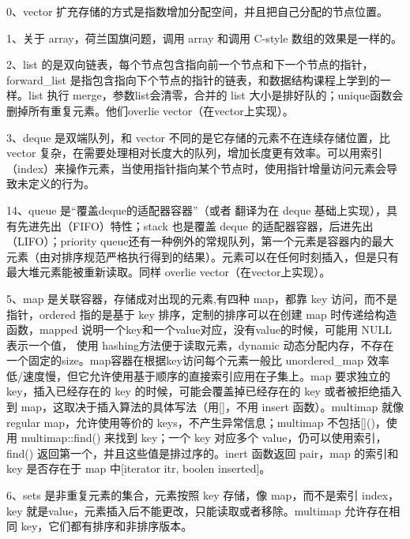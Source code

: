 

0、vector 扩充存储的方式是指数增加分配空间，并且把自己分配的节点位置。

1、关于 array，荷兰国旗问题，调用 array 和调用 C-\/style 数组的效果是一样的。

2、list 的是双向链表，每个节点包含指向前一个节点和下一个节点的指针，forward\+\_\+list 是指包含指向下个节点的指针的链表，和数据结构课程上学到的一样。list 执行 merge，参数list会清零，合并的 list 大小是排好队的；unique函数会删掉所有重复元素。他们overlie vector（在vector上实现）。

3、deque 是双端队列，和 vector 不同的是它存储的元素不在连续存储位置，比 vector 复杂，在需要处理相对长度大的队列，增加长度更有效率。可以用索引（index）来操作元素，当使用指针指向某个节点时，使用指针增量访问元素会导致未定义的行为。


\begin{DoxyCode}{0}
\DoxyCodeLine{}
\end{DoxyCode}


14、queue 是“覆盖deque的适配器容器”（或者 翻译为在 deque 基础上实现），具有先进先出（\+F\+I\+F\+O）特性；stack 也是覆盖 deque 的适配器容器，后进先出（\+L\+I\+F\+O）；priority queue还有一种例外的常规队列，第一个元素是容器内的最大元素（由对排序规范严格执行得到的结果）。元素可以在任何时刻插入，但是只有最大堆元素能被重新读取。同样 overlie vector（在vector上实现）。



5、map 是关联容器，存储成对出现的元素,有四种 map，都靠 key 访问，而不是指针，ordered 指的是基于 key 排序，定制的排序可以在创建 map 时传递给构造函数，mapped 说明一个key和一个value对应，没有value的时候，可能用 N\+U\+LL 表示一个值， 使用 hashing方法便于读取元素，dynamic 动态分配内存，不存在一个固定的size。map容器在根据key访问每个元素一般比 unordered\+\_\+map 效率低/速度慢，但它允许使用基于顺序的直接索引应用在子集上。map 要求独立的 key，插入已经存在的 key 的时候，可能会覆盖掉已经存在的 key 或者被拒绝插入到 map，这取决于插入算法的具体写法（用\mbox{[}\mbox{]}，不用 insert 函数）。multimap 就像 regular map，允许使用等价的 keys，不产生异常信息；multimap 不包括\mbox{[}\mbox{]}()，使用 multimap\+::find() 来找到 key；一个 key 对应多个 value，仍可以使用索引，find() 返回第一个，并且这些值是排过序的。inert 函数返回 pair，map 的索引和 key 是否存在于 map 中\mbox{[}iterator itr, boolen inserted\mbox{]}。

6、sets 是非重复元素的集合，元素按照 key 存储，像 map，而不是索引 index，key 就是value，元素插入后不能更改，只能读取或者移除。multimap 允许存在相同 key，它们都有排序和非排序版本。 